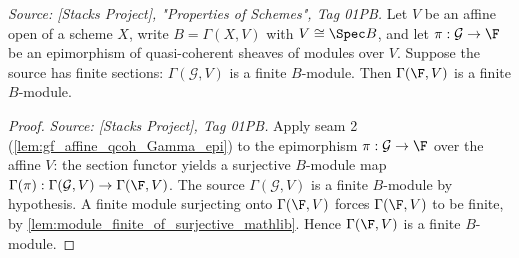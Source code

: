 \begin{lemma}
  \label{lem:gf_qcoh_finite_sections_globally_generated}
  \textit{Source: [Stacks Project], "Properties of Schemes", Tag 01PB.}
  Let \(V\) be an affine open of a scheme \(X\), write \(B = \Gamma(X, V)\) with
  \(V \cong \Spec B\), and let \(\pi : \mathcal{G} \to \F\) be an epimorphism of
  quasi-coherent sheaves of modules over \(V\). Suppose the source has finite sections:
  \(\Gamma(\mathcal{G}, V)\) is a finite \(B\)-module. Then \(\Gamma(\F, V)\) is a finite
  \(B\)-module.
\end{lemma}

\begin{proof}
  \leanok
  \textit{Source: [Stacks Project], Tag 01PB.}
  Apply seam 2 (\cref{lem:gf_affine_qcoh_Gamma_epi}) to the epimorphism
  \(\pi : \mathcal{G} \to \F\) over the affine \(V\): the section functor yields a
  surjective \(B\)-module map \(\Gamma(\pi) : \Gamma(\mathcal{G}, V) \to \Gamma(\F, V)\).
  The source \(\Gamma(\mathcal{G}, V)\) is a finite \(B\)-module by hypothesis. A finite
  module surjecting onto \(\Gamma(\F, V)\) forces \(\Gamma(\F, V)\) to be finite, by
  \cref{lem:module_finite_of_surjective_mathlib}. Hence \(\Gamma(\F, V)\) is a finite
  \(B\)-module.
\end{proof}

